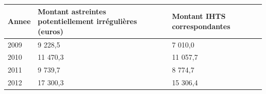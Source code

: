 \begin{longtable}[]{@{}lll@{}}
\toprule
\begin{minipage}[b]{0.07\columnwidth}\raggedright
Annee\strut
\end{minipage} & \begin{minipage}[b]{0.55\columnwidth}\raggedright
Montant astreintes potentiellement irrégulières (euros)\strut
\end{minipage} & \begin{minipage}[b]{0.29\columnwidth}\raggedright
Montant IHTS correspondantes\strut
\end{minipage}\tabularnewline
\midrule
\endhead
\begin{minipage}[t]{0.07\columnwidth}\raggedright
2009\strut
\end{minipage} & \begin{minipage}[t]{0.55\columnwidth}\raggedright
9 228,5\strut
\end{minipage} & \begin{minipage}[t]{0.29\columnwidth}\raggedright
7 010,0\strut
\end{minipage}\tabularnewline
\begin{minipage}[t]{0.07\columnwidth}\raggedright
2010\strut
\end{minipage} & \begin{minipage}[t]{0.55\columnwidth}\raggedright
11 470,3\strut
\end{minipage} & \begin{minipage}[t]{0.29\columnwidth}\raggedright
11 057,7\strut
\end{minipage}\tabularnewline
\begin{minipage}[t]{0.07\columnwidth}\raggedright
2011\strut
\end{minipage} & \begin{minipage}[t]{0.55\columnwidth}\raggedright
9 739,7\strut
\end{minipage} & \begin{minipage}[t]{0.29\columnwidth}\raggedright
8 774,7\strut
\end{minipage}\tabularnewline
\begin{minipage}[t]{0.07\columnwidth}\raggedright
2012\strut
\end{minipage} & \begin{minipage}[t]{0.55\columnwidth}\raggedright
17 300,3\strut
\end{minipage} & \begin{minipage}[t]{0.29\columnwidth}\raggedright
15 306,4\strut
\end{minipage}\tabularnewline

\end{longtable}
